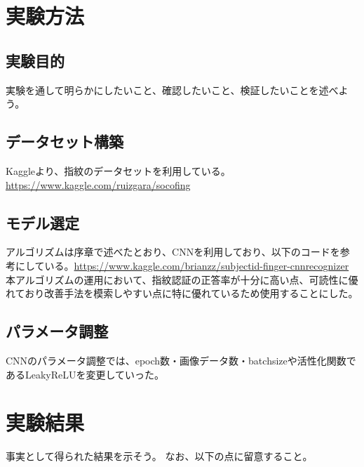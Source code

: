 \documentclass[a4paper, 11pt, titlepage]{jsarticle}
\begin{document}
\section{実験方法}


\subsection{実験目的}
実験を通して明らかにしたいこと、確認したいこと、検証したいことを述べよう。


\subsection{データセット構築}
Kaggleより、指紋のデータセットを利用している。\url{https://www.kaggle.com/ruizgara/socofing}

\subsection{モデル選定}
アルゴリズムは序章で述べたとおり、CNNを利用しており、以下のコードを参考にしている。\url{https://www.kaggle.com/brianzz/subjectid-finger-cnnrecognizer}\\
本アルゴリズムの運用において、指紋認証の正答率が十分に高い点、可読性に優れており改善手法を模索しやすい点に特に優れているため使用することにした。

\subsection{パラメータ調整}
CNNのパラメータ調整では、epoch数・画像データ数・batchsizeや活性化関数であるLeakyReLUを変更していった。


\section{実験結果}
事実として得られた結果を示そう。
なお、以下の点に留意すること。
\end{document}
